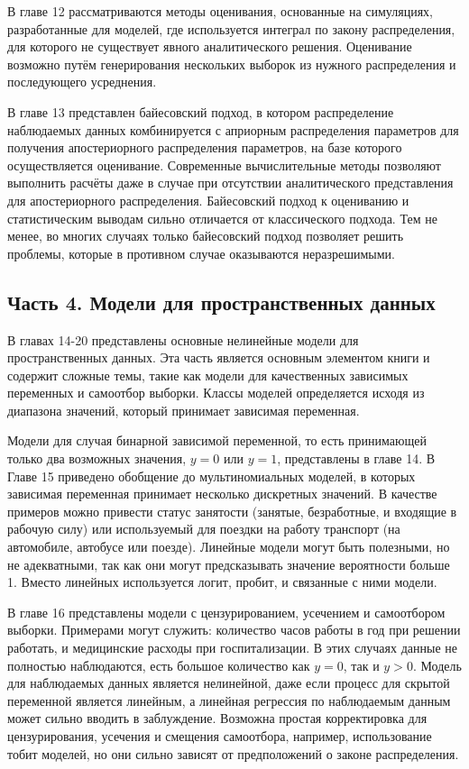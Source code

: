	
В главе 12 рассматриваются методы оценивания, основанные на симуляциях, разработанные для моделей, где используется интеграл по закону распределения, для которого не существует явного аналитического решения. Оценивание возможно путём генерирования нескольких выборок из нужного распределения и последующего усреднения.
	
	
В главе 13 представлен байесовский подход, в котором  распределение наблюдаемых данных комбинируется с  априорным распределения параметров для получения  апостериорного распределения параметров, на базе которого осуществляется оценивание. Современные вычислительные методы  позволяют выполнить расчёты даже в случае при отсутствии аналитического представления для апостериорного распределения. Байесовский подход к оцениванию и статистическим выводам сильно отличается от классического подхода. Тем не менее, во многих случаях только байесовский подход позволяет решить проблемы, которые в противном случае оказываются неразрешимыми.

\subsection{Часть 4. Модели для пространственных данных}

В главах 14-20 представлены основные нелинейные модели для пространственных данных. Эта часть является основным элементом книги и содержит сложные темы, такие как модели для качественных зависимых переменных и самоотбор выборки. Классы моделей определяется исходя из диапазона значений, который принимает зависимая переменная.
	
	
Модели для случая бинарной зависимой переменной, то есть принимающей только два возможных значения, $y = 0$ или $y = 1$, представлены в главе 14. В Главе 15 приведено обобщение до мультиномиальных моделей, в которых зависимая переменная  принимает несколько дискретных значений. В качестве примеров можно привести статус занятости (занятые, безработные, и входящие в рабочую силу) или используемый для поездки на работу транспорт (на автомобиле, автобусе или поезде). Линейные модели могут быть полезными, но не адекватными, так как они могут предсказывать значение вероятности больше 1. Вместо линейных используется логит, пробит, и связанные с ними модели.
	
	
В главе 16 представлены модели с цензурированием, усечением и самоотбором выборки. Примерами могут служить: количество часов работы в год при решении работать, и медицинские расходы при госпитализации. В этих случаях данные не полностью наблюдаются, есть большое количество как $y = 0$, так и $y > 0$. Модель для наблюдаемых данных является нелинейной, даже если  процесс для скрытой переменной является линейным, а линейная регрессия по наблюдаемым данным  может сильно вводить в заблуждение. Возможна простая корректировка для цензурирования, усечения и смещения самоотбора, например, использование тобит моделей, но они сильно зависят от  предположений о законе распределения.
	

